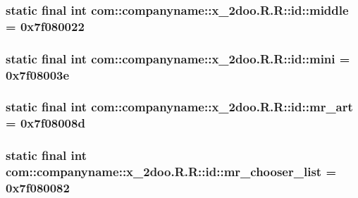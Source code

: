 \hypertarget{classcom_1_1companyname_1_1x__2doo_1_1_r_1_1id_c7c9e2f9ec1f9ea39d08e37bd7170e7e}{
\subsubsection[{middle}]{\setlength{\rightskip}{0pt plus 5cm}static final int com::companyname::x\_\-2doo.R.R::id::middle = 0x7f080022}}
\label{classcom_1_1companyname_1_1x__2doo_1_1_r_1_1id_c7c9e2f9ec1f9ea39d08e37bd7170e7e}


\hypertarget{classcom_1_1companyname_1_1x__2doo_1_1_r_1_1id_f68d3c0f3e840a4bc33333154e74abb9}{
\subsubsection[{mini}]{\setlength{\rightskip}{0pt plus 5cm}static final int com::companyname::x\_\-2doo.R.R::id::mini = 0x7f08003e}}
\label{classcom_1_1companyname_1_1x__2doo_1_1_r_1_1id_f68d3c0f3e840a4bc33333154e74abb9}


\hypertarget{classcom_1_1companyname_1_1x__2doo_1_1_r_1_1id_1ebd44e74fb83da5c53ee87098ed0a78}{
\subsubsection[{mr\_\-art}]{\setlength{\rightskip}{0pt plus 5cm}static final int com::companyname::x\_\-2doo.R.R::id::mr\_\-art = 0x7f08008d}}
\label{classcom_1_1companyname_1_1x__2doo_1_1_r_1_1id_1ebd44e74fb83da5c53ee87098ed0a78}


\hypertarget{classcom_1_1companyname_1_1x__2doo_1_1_r_1_1id_ea5f22149d71e84b8e88e3a567d6e027}{
\subsubsection[{mr\_\-chooser\_\-list}]{\setlength{\rightskip}{0pt plus 5cm}static final int com::companyname::x\_\-2doo.R.R::id::mr\_\-chooser\_\-list = 0x7f080082}}
\label{classcom_1_1companyname_1_1x__2doo_1_1_r_1_1id_ea5f22149d71e84b8e88e3a567d6e027}


